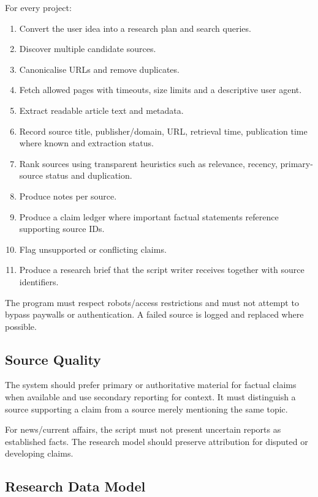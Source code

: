 \documentclass[10pt,journal,compsoc]{IEEEtran}
\begin{document}
For every project:
\begin{enumerate}
    \item Convert the user idea into a research plan and search queries.
    \item Discover multiple candidate sources.
    \item Canonicalise URLs and remove duplicates.
    \item Fetch allowed pages with timeouts, size limits and a descriptive user agent.
    \item Extract readable article text and metadata.
    \item Record source title, publisher/domain, URL, retrieval time, publication time where known and extraction status.
    \item Rank sources using transparent heuristics such as relevance, recency, primary-source status and duplication.
    \item Produce notes per source.
    \item Produce a claim ledger where important factual statements reference supporting source IDs.
    \item Flag unsupported or conflicting claims.
    \item Produce a research brief that the script writer receives together with source identifiers.
\end{enumerate}

The program must respect robots/access restrictions and must not attempt to bypass paywalls or authentication. A failed source is logged and replaced where possible.

\subsection{Source Quality}

The system should prefer primary or authoritative material for factual claims when available and use secondary reporting for context. It must distinguish a source supporting a claim from a source merely mentioning the same topic.

For news/current affairs, the script must not present uncertain reports as established facts. The research model should preserve attribution for disputed or developing claims.

\subsection{Research Data Model}
\end{document}
